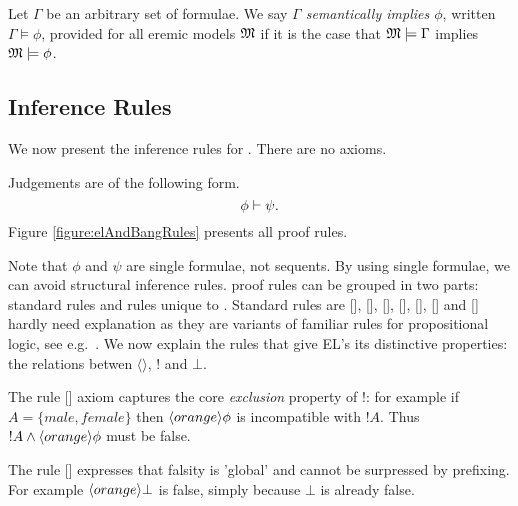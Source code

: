 



\begin{definition}
Let $\Gamma$ be an arbitrary set of formulae. We say \emph{$\Gamma$
  semantically implies $\phi$}, written $\Gamma \models \phi$,
provided for all eremic models $\frak{M}$ if it is the case that $\frak{M}
\models \Gamma$ implies $\frak{M} \models \phi$. 
\end{definition}


\subsection{Inference Rules}



\NI We now present the inference rules for \ELFULL{}. There are no
axioms.

\begin{definition} Judgements are of the following form.
\[
  \phi \vdash \psi.
\]
Figure \ref{figure:elAndBangRules} presents all proof rules. 
\end{definition}

\NI Note that $\phi$ and $\psi$ are single formulae, not sequents.  By
using single formulae, we can avoid structural inference rules.  \ELABR{}
proof rules can be grouped in two parts: standard rules and rules
unique to \ELABR{}.  Standard rules are [],
[], [],
[], [],
[] and [] hardly need
explanation as they are variants of familiar rules for propositional
logic, see e.g.~\cite{TroelstraAS:basprot,vanDalenD:logstr}.  We now
explain the rules that give EL's its distinctive properties: the
relations betwen $\langle \rangle$, $!$ and $\bot$.

The rule [] axiom captures the core
\emph{exclusion} property of !: for example if $A = \{male, female\}$
then $\langle orange \rangle \phi$ is incompatible with $!A$. Thus $!A \land
\langle orange \rangle \phi$ must be false.

The rule [] expresses that falsity is 'global'
  and cannot be surpressed by prefixing. For example
  $\langle orange \rangle \bot$ is false, simply because $\bot$ is already
  false.

